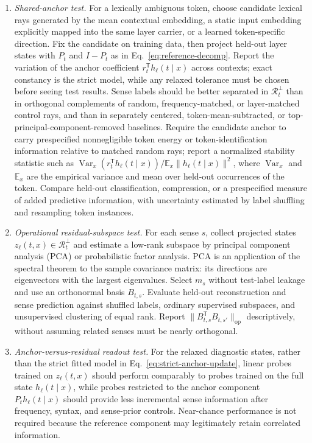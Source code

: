 \documentclass[
  aps,
  reprint,
  superscriptaddress,
  floatfix,
  nofootinbib,
  longbibliography
]{revtex4-2}
\newcommand{\E}{\mathbb{E}}
\newcommand{\T}{^{\mathsf{T}}}
\newcommand{\opnorm}[1]{\lVert #1 \rVert_{\mathrm{op}}}
\newcommand{\norm}[1]{\lVert #1 \rVert}
\DeclareMathOperator{\Var}{Var}
\begin{document}
\begin{enumerate}
\item \emph{Shared-anchor test.}
For a lexically ambiguous token, choose candidate lexical rays generated
by the mean contextual embedding, a static input embedding explicitly mapped
into the same layer carrier,
or a learned token-specific direction.  Fix the candidate on training data,
then project held-out layer states with $P_t$ and $I-P_t$ as in
Eq.~\eqref{eq:reference-decomp}.  Report the variation of the anchor coefficient
$r_t\T h_\ell(t\mid x)$ across contexts; exact constancy is the strict model,
while any relaxed tolerance must be chosen before seeing test results.  Sense labels
should be better separated in $\mathcal R_t^\perp$ than in orthogonal
complements of random, frequency-matched, or layer-matched control rays, and
than in separately centered, token-mean-subtracted, or
top-principal-component-removed baselines.  Require the candidate anchor to
carry prespecified nonnegligible token energy or token-identification
information relative to matched random rays; report a normalized stability
statistic such as
$\Var_x(r_t\T h_\ell(t\mid x))/\E_x\norm{h_\ell(t\mid x)}^2$,
where $\Var_x$ and $\E_x$ are the empirical variance and mean over held-out
occurrences of the token.
Compare held-out classification, compression, or a prespecified measure of
added predictive information, with uncertainty estimated by label shuffling
and resampling token instances.

\item \emph{Operational residual-subspace test.}
For each sense $s$, collect projected states
$z_\ell(t,x)\in\mathcal R_t^\perp$ and estimate a low-rank subspace by
principal component analysis (PCA) or probabilistic factor analysis.  PCA is
an application of the spectral theorem to the sample covariance matrix: its
directions are eigenvectors with the largest eigenvalues.  Select $m_s$
without test-label leakage and use
an orthonormal basis $B_{t,s}$.  Evaluate held-out reconstruction and sense
prediction against shuffled labels, ordinary supervised subspaces, and
unsupervised clustering of equal rank.  Report
$\opnorm{B_{t,s}\T B_{t,s'}}$ descriptively, without assuming related senses
must be nearly orthogonal.

\item \emph{Anchor-versus-residual readout test.}
For the relaxed diagnostic states, rather than the strict fitted model in
Eq.~\eqref{eq:strict-anchor-update}, linear probes trained on
$z_\ell(t,x)$ should perform comparably to
probes trained on the full state $h_\ell(t\mid x)$, while probes
restricted to the anchor component $P_t h_\ell(t\mid x)$ should provide
less incremental sense information after frequency, syntax, and sense-prior
controls.  Near-chance performance is not required because the reference
component may legitimately retain correlated information.


\end{enumerate}
\end{document}
